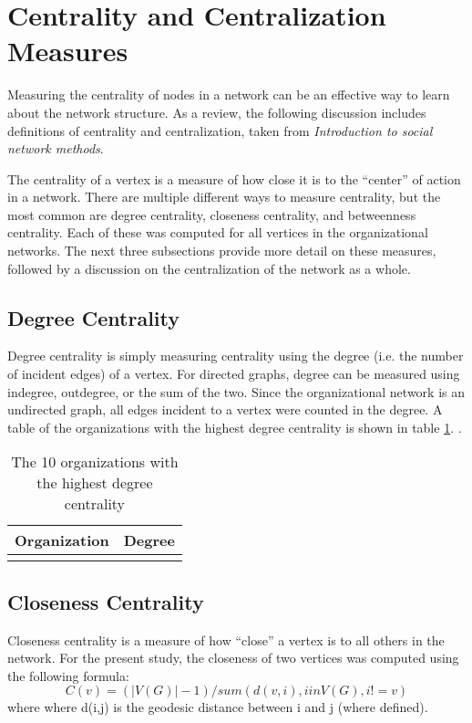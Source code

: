 \section{Centrality and Centralization Measures}


Measuring the centrality of nodes in a network can be an effective way to learn about the network structure. As a review, the following discussion includes definitions of centrality and centralization, taken from \textit{Introduction to social network methods}\cite{hanneman}.

The centrality of a vertex is a measure of how close it is to the ``center'' of action in a network. There are multiple different ways to measure centrality, but the most common are degree centrality, closeness centrality, and betweenness centrality. Each of these was computed for all vertices in the organizational networks. The next three subsections provide more detail on these measures, followed by a discussion on the centralization of the network as a whole.

\subsection{Degree Centrality}
Degree centrality is simply measuring centrality using the degree (i.e. the number of incident edges) of a vertex. For directed graphs, degree can be measured using indegree, outdegree, or the sum of the two. Since the organizational network is an undirected graph, all edges incident to a vertex were counted in the degree. A table of the organizations with the highest degree centrality is shown in table \ref{tab:degree}. . 

\begin{table}
	\begin{tabular}{l|c}%
		\bfseries Organization & \bfseries Degree%
		\csvreader[head to column names]{degree.csv}{}%
		{\\\hline\organizationa & \scorea}%
	\end{tabular}
	\centering
	\caption{The 10 organizations with the highest degree centrality}\label{tab:degree}
\end{table}
\subsection{Closeness Centrality}
Closeness centrality is a measure of how ``close'' a vertex is to all others in the network. For the present study, the closeness of two vertices was computed using the following formula:
\begin{equation*}
	C(v) = (|V(G)|-1)/sum( d(v,i), i in V(G), i!=v )
\end{equation*}
where where d(i,j) is the geodesic distance between i and j (where defined)\cite{butts}.  

